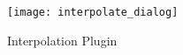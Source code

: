 
\begin{figure}[ht]
   \begin{center}
   \caption{Interpolation Plugin \nixcaption}\label{fig:interpolation_dialog}\smallskip
   \texttt{[image: interpolate\_dialog]}
\end{center}  
\end{figure}


